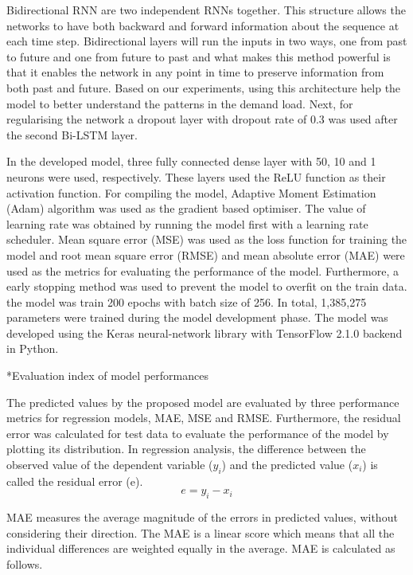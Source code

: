 \documentclass[twocolumn, a4paper,10pt]{article}
\makeatletter
\renewcommand\subsubsection{\@startsection{subsection}{1}{\z@}{0.2cm}{0.1cm}{\normalfont\normalsize\itshape}}
\makeatother
\begin{document}
Bidirectional RNN are two independent RNNs together. This structure allows the networks to have both backward and forward information about the sequence at each time step. Bidirectional layers will run the inputs in two ways, one from past to future and one from future to past and what makes this method powerful is that it enables the network in any point in time to preserve information from both past and future. Based on our experiments, using this architecture help the model to better understand the patterns in the demand load. Next, for regularising the network a dropout layer with dropout rate of 0.3 was used after the second Bi-LSTM layer.

 In the developed model, three fully connected dense layer with 50, 10 and 1 neurons were used, respectively. These layers used the ReLU function as their activation function.  For compiling the model, Adaptive Moment Estimation (Adam) \citep{RN1292} algorithm was used as the gradient based optimiser. The value of learning rate was obtained by running the model first with a learning rate scheduler.
Mean square error (MSE) was used as the loss function for training the model and root mean square error (RMSE) and mean absolute error (MAE) were used as the metrics for evaluating the performance of the model. Furthermore, a early stopping method was used to prevent the model to overfit on the train data. the model was train 200 epochs with batch size of 256. In total, 1,385,275 parameters were trained during the model development phase. The model was developed using the Keras neural-network library with TensorFlow 2.1.0 backend in Python.

\subsubsection*{Evaluation index of model performances}

The predicted values by the proposed model are evaluated by three performance metrics for regression models, MAE, MSE and RMSE. Furthermore, the residual error was calculated for test data to evaluate the performance of the model by plotting its distribution. In regression analysis, the difference between the observed value of the dependent variable ($y_{i}$) and the predicted value ($x_{i}$) is called the residual error (e).
$$ e = y_{i} - x_{i} $$

MAE measures the average magnitude of the errors in predicted values, without considering their direction. The MAE is a linear score which means that all the individual differences are weighted equally in the average. MAE is calculated as follows.
\end{document}
